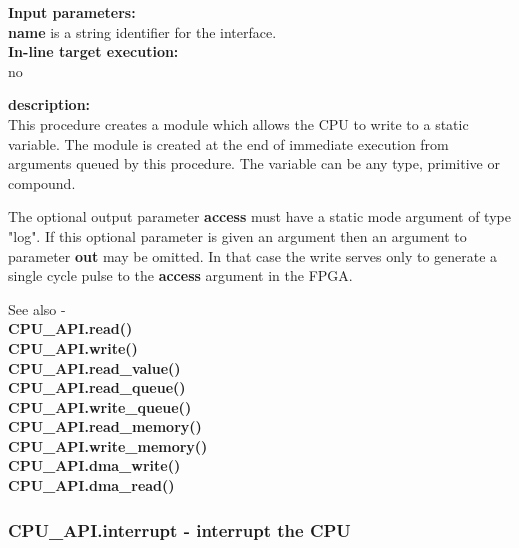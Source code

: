             {\bf Input parameters:} \\
            {\bf name} is a string identifier for the interface.\\
        
            {\bf In-line target execution:} \\
            no

            {\bf description:} \\
            This procedure creates a module which allows the CPU to write to a
            static variable. The module is created at the end of immediate
            execution from arguments queued by this procedure. The variable can
            be any type, primitive or compound.
                       
            The optional output parameter {\bf access} must have a static mode
            argument of type "log". If this optional parameter is given an
            argument then an argument to parameter {\bf out} may be omitted. In
            that case the write serves only to generate a single cycle pulse to
            the {\bf access} argument in the FPGA.
                        
            

            See also - \\
            {\bf CPU\_API.read()}  \\
            {\bf CPU\_API.write()}  \\
            {\bf CPU\_API.read\_value()}  \\
            {\bf CPU\_API.read\_queue()}  \\
            {\bf CPU\_API.write\_queue()}  \\
            {\bf CPU\_API.read\_memory()}  \\
            {\bf CPU\_API.write\_memory()}  \\
            {\bf CPU\_API.dma\_write()}  \\
            {\bf CPU\_API.dma\_read()}  \\





        \subsubsection{CPU\_API.interrupt - interrupt the CPU}\label{sec:lpinterrupt}

